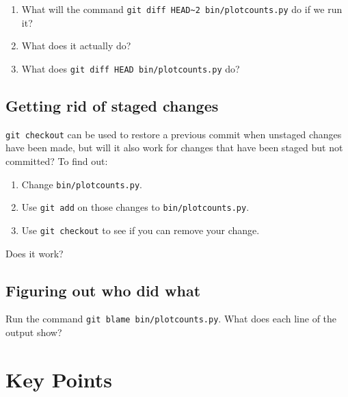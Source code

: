 \documentclass[
]{krantz}
\providecommand{\tightlist}{%
  \setlength{\itemsep}{0pt}\setlength{\parskip}{0pt}}
\begin{document}
\begin{enumerate}
\def\labelenumi{\arabic{enumi}.}
\tightlist
\item
  What will the command \texttt{git\ diff\ HEAD\textasciitilde{}2\ bin/plotcounts.py} do if we run it?
\item
  What does it actually do?
\item
  What does \texttt{git\ diff\ HEAD\ bin/plotcounts.py} do?
\end{enumerate}

\hypertarget{git-cmdline-ex-unstage}{%
\subsection{Getting rid of staged changes}\label{git-cmdline-ex-unstage}}

\texttt{git\ checkout} can be used to restore a previous commit when unstaged changes have been made,
but will it also work for changes that have been staged but not committed?
To find out:

\begin{enumerate}
\def\labelenumi{\arabic{enumi}.}
\tightlist
\item
  Change \texttt{bin/plotcounts.py}.
\item
  Use \texttt{git\ add} on those changes to \texttt{bin/plotcounts.py}.
\item
  Use \texttt{git\ checkout} to see if you can remove your change.
\end{enumerate}

Does it work?

\hypertarget{git-cmdline-ex-blame}{%
\subsection{Figuring out who did what}\label{git-cmdline-ex-blame}}

Run the command \texttt{git\ blame\ bin/plotcounts.py}.
What does each line of the output show?

\hypertarget{git-cmdline-keypoints}{%
\section{Key Points}\label{git-cmdline-keypoints}}
\end{document}
